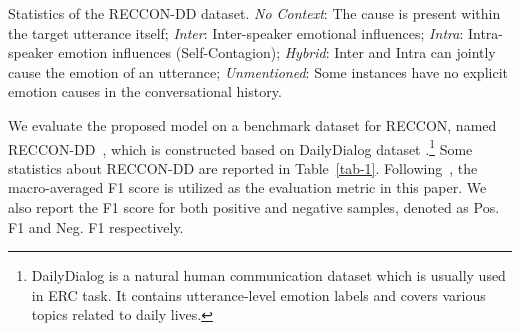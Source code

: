 \documentclass[11pt]{article}
\begin{document}
\begin{table}[tbp]
\caption{Statistics of the RECCON-DD dataset. \textit{No Context}: The cause is present within the target utterance itself; \textit{Inter}: Inter-speaker emotional influences; \textit{Intra}: Intra-speaker emotion influences (Self-Contagion); \textit{Hybrid}: Inter and Intra can jointly cause the emotion of an utterance; \textit{Unmentioned}: Some instances have no explicit emotion causes in the conversational history.}
\label{tab-1}
\end{table}
	
We evaluate the proposed model on a benchmark dataset for RECCON, named RECCON-DD~\citep{poria2021recognizing}, which is constructed based on DailyDialog dataset \cite{li2017dailydialog}.\footnote{DailyDialog is a natural human communication dataset which is usually used in ERC task. It contains utterance-level emotion labels and covers various topics related to daily lives.} Some statistics about RECCON-DD are reported in Table~\ref{tab-1}. Following~\citep{poria2021recognizing}, the macro-averaged F1 score is utilized as the evaluation metric in this paper. We also report the F1 score for both positive and negative samples, denoted as Pos. F1 and Neg. F1 respectively. 
\end{document}
